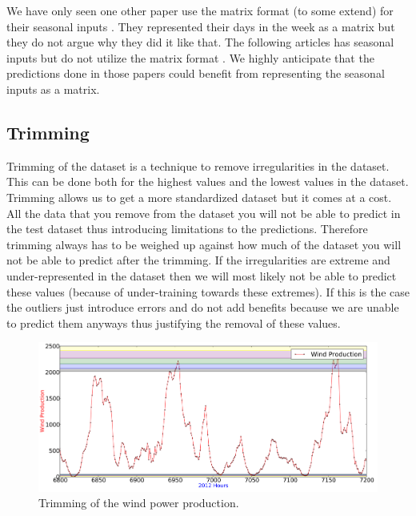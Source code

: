 We have only seen one other paper use the matrix format (to some extend) for their seasonal inputs \cite{crowley2005weather}. They represented their days in the week as a matrix but they do not argue why they did it like that. The following articles has seasonal inputs but do not utilize the matrix format \cite{szkuta1999electricity, singhal2011electricity}. We highly anticipate that the predictions done in those papers could benefit from representing the seasonal inputs as a matrix. 

\subsection{Trimming}
Trimming of the dataset is a technique to remove irregularities in the dataset. This can be done both for the highest values and the lowest values in the dataset. Trimming allows us to get a more standardized dataset but it comes at a cost. All the data that you remove from the dataset you will not be able to predict in the test dataset thus introducing limitations to the predictions. Therefore trimming always has to be weighed up against how much of the dataset you will not be able to predict after the trimming. If the irregularities are extreme and under-represented in the dataset then we will most likely not be able to predict these values (because of under-training towards these extremes). If this is the case the outliers just introduce errors and do not add benefits because we are unable to predict them anyways thus justifying the removal of these values.

\begin{figure}[H]
\centering
\includegraphics[width=0.99\linewidth]{billeder/pointingOutPlaceWhereTrim.png}
\caption{Trimming of the wind power production.}
\label{fig:pointingOutPlaceWhereTrimDataManipulation}
\end{figure}

